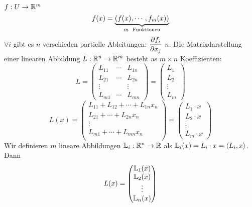   $f:U\rightarrow\mathbb{R}^m$
  \[f(x)=\underbrace{(f(x),\cdots,f_m(x))}_{m\hspace{2mm}\text{Funktionen}}\]
  $\forall i$ gibt es $n$ verschieden partielle Ableitungen: $\dfrac{\partial f_i}{\partial x_j}$ $n$. DIe Matrixdarstellung
  einer linearen Abbildung $L:\mathbb{R}^n\rightarrow\mathbb{R}^m$ besteht as $m\times n$ Koeffizienten:
  \[L = \begin{pmatrix}
    L_{11} & \cdots & L_{1n}\\
    L_{21} & \cdots & L_{2n}\\
    \vdots & & \vdots \\
    L_{m1} & \cdots & L_{mn}
  \end{pmatrix} = \begin{pmatrix}
    L_1 \\ L_2 \\ \vdots \\ L_m
  \end{pmatrix}\]
  \[L(x) = \begin{pmatrix}
    L_{11}+L_{12}+\cdots +L_{1n}x_n\\
    L_{21}+\cdots +L_{2n}x_n\\
    \vdots \\
    L_{m1}+\cdots +L_{mn}x_n\\
  \end{pmatrix} = \begin{pmatrix}
    L_1\cdot  x\\ L_2\cdot  x\\ \vdots \\ L_m\cdot  x
  \end{pmatrix}\]
  Wir definieren $m$ lineare Abbildungen $\mathbb{L}_i:\mathbb{R}^n\rightarrow\mathbb{R}$
als $\mathbb{L}_i (x) = L_i\cdot x = \langle L_i, x\rangle$. Dann
  \[L(x)= \begin{pmatrix}
    \mathbb{L}_1(x)\\
    \mathbb{L}_2(x)\\
    \vdots \\
    \mathbb{L}_n(x)\\
  \end{pmatrix}\]

